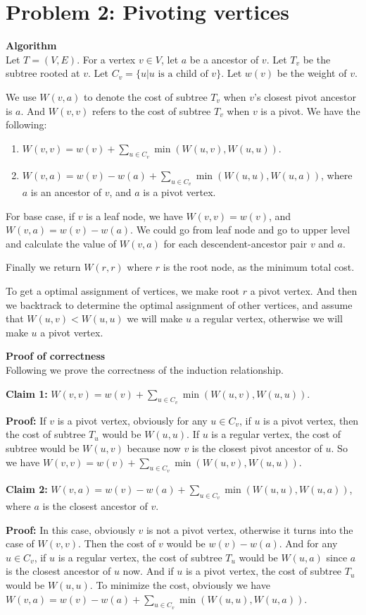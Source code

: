 \documentclass{article}
\newcommand{\Proof}{\vspace{0.3cm} \noindent\textbf{Proof of correctness} \vspace{0.2cm} \\}
\newcommand{\Algorithm}{\textbf{Algorithm} \vspace{0.2cm}\\}
\begin{document}
\section*{Problem 2: Pivoting vertices}
\Algorithm
Let $T = (V, E)$. For a vertex $v \in V$, let $a$ be a ancestor of $v$. Let $T_v$ be the subtree
rooted at $v$. Let $C_v = \{u | u \text{ is a child of } v\}$. Let $w(v)$ be the weight of $v$.

We use $W(v, a)$ to denote the cost of subtree $T_v$ when $v$'s closest pivot ancestor is
$a$. And $W(v, v)$ refers to the cost of subtree $T_v$ when $v$ is a pivot.   
We have the following:
\begin{enumerate}
  \item $W(v, v) = w(v) + \sum_{u \in C_v} \min(W(u, v), W(u, u))$. 
  \item $W(v, a) = w(v) - w(a) + \sum_{u \in C_v} \min( W(u, u), W(u, a))$, where $a$ is an ancestor of
    $v$, and $a$ is a pivot vertex.
\end{enumerate}

For base case, if $v$ is a leaf node, we have $W(v, v) = w(v)$, and $W(v, a) = w(v) - w(a)$. We
could go from leaf node and go to upper level and calculate the value of $W(v, a)$ for each
descendent-ancestor pair $v$ and $a$. 

Finally we return $W(r, r)$ where $r$ is the root node, as the minimum total cost.

To get a optimal assignment of vertices, we make root $r$ a pivot vertex. And then we backtrack
to determine the optimal assignment of other vertices, and assume that $W(u, v) < W(u, u)$ we will
make $u$ a regular vertex, otherwise we will make $u$ a pivot vertex.  
 
\Proof
Following we prove the correctness of the induction relationship. 

\textbf{Claim 1:}
$W(v, v) = w(v) + \sum_{u \in C_v} \min(W(u, v), W(u, u))$. 

\textbf{Proof:}
If $v$ is a pivot vertex, obviously for any $u \in C_v$, if $u$ is a pivot vertex,
then the cost of subtree $T_u$ would be $W(u, u)$. If $u$ is a regular vertex, the cost of subtree
would be $W(u, v)$ because now $v$ is the closest pivot ancestor of $u$. So we have 
$W(v, v) = w(v) + \sum_{u \in C_v} \min(W(u, v), W(u, u))$. 

\textbf{Claim 2:}
 $W(v, a) = w(v) - w(a) + \sum_{u \in C_v} \min( W(u, u), W(u, a))$, where $a$ is the closest ancestor of
 $v$.

\textbf{Proof:}
In this case, obviously $v$ is not a pivot vertex, otherwise it turns into the case of $W(v, v)$.
Then the cost of $v$ would be $w(v) - w(a)$. And for any $u \in C_v$, if $u$ is a regular vertex,
the cost of subtree $T_u$ would be $W(u, a)$ since $a$ is the closest ancestor of $u$ now. And if 
$u$ is a pivot vertex, the cost of subtree $T_u$ would be $W(u, u)$. To minimize the cost, obviously we have  
$W(v, a) = w(v) - w(a) + \sum_{u \in C_v} \min( W(u, u), W(u, a))$.
\end{document}
